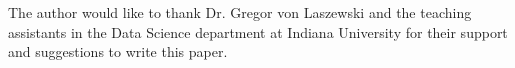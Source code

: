 \documentclass[sigconf]{acmart}
\begin{document}
\begin{acks}

  The author would like to thank Dr. Gregor von Laszewski and the teaching assistants in the Data Science department at Indiana University for their support and suggestions to write this paper.

\end{acks}




 
\end{document}
